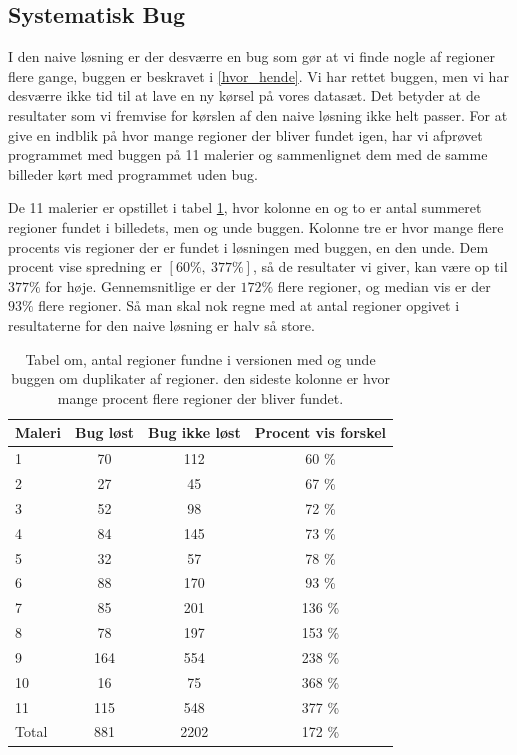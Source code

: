 {\subsection{Systematisk Bug}
I den naive løsning er der desværre en bug som gør at vi finde nogle af
regioner flere gange, buggen er beskravet i \ref{hvor_hende}. Vi har
rettet buggen, men vi har desværre ikke tid til at lave en ny kørsel på
vores datasæt. Det betyder at de resultater som vi fremvise for kørslen
af den naive løsning ikke helt passer. For at give en indblik på hvor
mange regioner der bliver fundet igen, har vi afprøvet programmet med
buggen på 11 malerier og sammenlignet dem med de samme billeder kørt med
programmet uden bug.

De 11 malerier er opstillet i tabel \ref{bug_tabel}, hvor kolonne en og
to er antal summeret regioner fundet i billedets, men og unde buggen.
Kolonne tre er hvor mange flere procents vis regioner der er fundet i
løsningen med buggen, en den unde. Dem procent vise spredning er $[60
\%,~377 \%]$, så de resultater vi giver, kan være op til $377\%$ for
høje. Gennemsnitlige er der $172 \%$ flere regioner, og median vis er
der $93\%$ flere regioner. Så man skal nok regne med at antal regioner
opgivet i resultaterne for den naive løsning er halv så store.

\begin{table}[!h]
    \centering
    \begin{tabular}{|l|c|c|c|}
        \hline
  Maleri  & Bug løst 		& Bug ikke løst		& Procent vis forskel\\\hline
        1   & 70 			& 112 				& 60 \% \\\hline
        2   & 27 			& 45 				& 67 \% \\\hline
        3	& 52 			& 98 				& 72 \% \\\hline
        4   & 84 			& 145 				& 73 \% \\\hline
        5	& 32 			& 57 				& 78 \% \\\hline
        6   & 88 			& 170 				& 93 \% \\\hline
        7   & 85 			& 201 				& 136 \% \\\hline
        8   & 78 			& 197 				& 153 \% \\\hline
        9   & 164 			& 554 				& 238 \% \\\hline
        10	& 16 			& 75 				& 368 \% \\\hline
        11	& 115 			& 548 				& 377 \% \\\hline
	Total	& 881			& 2202				& 172 \% \\\hline
	  \end{tabular}
    \caption[]{Tabel om, antal regioner fundne i versionen med og unde
    buggen om duplikater af regioner. den sideste kolonne er hvor mange
    procent flere regioner der bliver fundet.}
    \label{bug_tabel}
\end{table}

}
